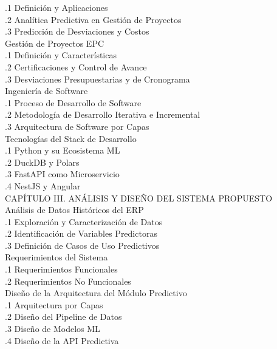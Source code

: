 \documentclass{univalle-perfil}
\begin{document}
\begin{indicetentativo}
\quad{}.1 Definición y Aplicaciones \\
\quad{}.2 Analítica Predictiva en Gestión de Proyectos \\
\quad{}.3 Predicción de Desviaciones y Costos \\
 Gestión de Proyectos EPC \\
\quad{}.1 Definición y Características \\
\quad{}.2 Certificaciones y Control de Avance \\
\quad{}.3 Desviaciones Presupuestarias y de Cronograma \\
 Ingeniería de Software \\
\quad{}.1 Proceso de Desarrollo de Software \\
\quad{}.2 Metodología de Desarrollo Iterativa e Incremental \\
\quad{}.3 Arquitectura de Software por Capas \\
 Tecnologías del Stack de Desarrollo \\
\quad{}.1 Python y su Ecosistema ML \\
\quad{}.2 DuckDB y Polars \\
\quad{}.3 FastAPI como Microservicio \\
\quad{}.4 NestJS y Angular \\[2pt]
CAPÍTULO III. ANÁLISIS Y DISEÑO DEL SISTEMA PROPUESTO \\
 Análisis de Datos Históricos del ERP \\
\quad{}.1 Exploración y Caracterización de Datos \\
\quad{}.2 Identificación de Variables Predictoras \\
\quad{}.3 Definición de Casos de Uso Predictivos \\
 Requerimientos del Sistema \\
\quad{}.1 Requerimientos Funcionales \\
\quad{}.2 Requerimientos No Funcionales \\
 Diseño de la Arquitectura del Módulo Predictivo \\
\quad{}.1 Arquitectura por Capas \\
\quad{}.2 Diseño del Pipeline de Datos \\
\quad{}.3 Diseño de Modelos ML \\
\quad{}.4 Diseño de la API Predictiva \\

\end{indicetentativo}
\end{document}
